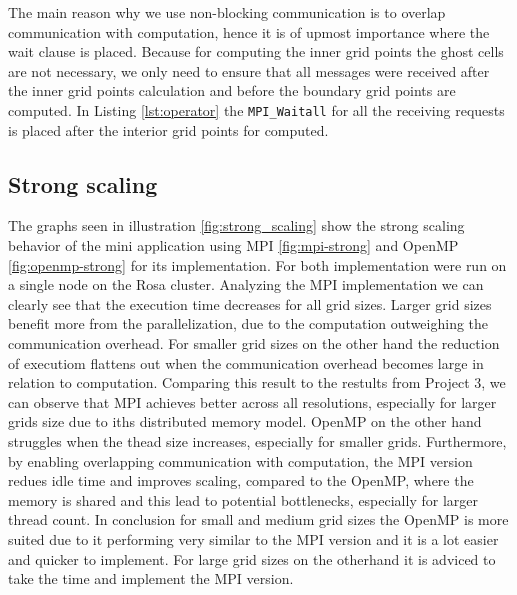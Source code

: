 The main reason why we use non-blocking communication is to overlap communication with computation, hence it is of upmost importance where the wait clause is placed. Because for computing the inner grid points the ghost cells are not necessary, we only need to ensure that all messages were received after the inner grid points calculation and before the boundary grid points are computed. In Listing \ref{lst:operator} the \texttt{MPI\_Waitall} for all the receiving requests is placed after the interior grid points for computed.
\subsection{Strong scaling}
The graphs seen in illustration \ref{fig:strong_scaling} show the strong scaling behavior of the mini application using MPI \ref{fig:mpi-strong} and OpenMP \ref{fig:openmp-strong} for its implementation. For both implementation were run on a single node on the Rosa cluster. Analyzing the MPI implementation we can clearly see that the execution time decreases for all grid sizes. Larger grid sizes benefit more from the parallelization, due to the computation outweighing the communication overhead. For smaller grid sizes on the other hand the reduction of executiom flattens out when the communication overhead becomes large in relation to computation.\newline
Comparing this result to the restults from Project 3, we can observe that MPI achieves better across all resolutions, especially for larger grids size due to iths distributed memory model. OpenMP on the other hand struggles when the thead size increases, especially for smaller grids. Furthermore, by enabling overlapping communication with computation, the MPI version redues idle time and improves scaling, compared to the OpenMP, where the memory is shared and this lead to potential bottlenecks, especially for larger thread count.
In conclusion for small and medium grid sizes the OpenMP is more suited due to it performing very similar to the MPI version and it is a lot easier and quicker to implement. For large grid sizes on the otherhand it is adviced to take the time and implement the MPI version.
